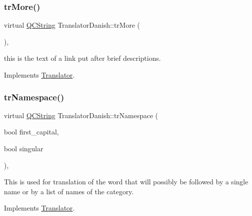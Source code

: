 \mbox{\label{class_translator_danish_a8932b41cc74e969bb4c98dac0f7d1954}} 
\subsubsection{\texorpdfstring{trMore()}{trMore()}}
{\footnotesize\ttfamily virtual \mbox{\hyperlink{class_q_c_string}{Q\+C\+String}} Translator\+Danish\+::tr\+More (\begin{DoxyParamCaption}{ }\end{DoxyParamCaption})\hspace{0.3cm}{\ttfamily [inline]}, {\ttfamily [virtual]}}

this is the text of a link put after brief descriptions. 

Implements \mbox{\hyperlink{class_translator}{Translator}}.

\mbox{\label{class_translator_danish_abab7ef00cc51eb265597124961d8f86b}} 
\subsubsection{\texorpdfstring{trNamespace()}{trNamespace()}}
{\footnotesize\ttfamily virtual \mbox{\hyperlink{class_q_c_string}{Q\+C\+String}} Translator\+Danish\+::tr\+Namespace (\begin{DoxyParamCaption}\item[{bool}]{first\+\_\+capital,  }\item[{bool}]{singular }\end{DoxyParamCaption})\hspace{0.3cm}{\ttfamily [inline]}, {\ttfamily [virtual]}}

This is used for translation of the word that will possibly be followed by a single name or by a list of names of the category. 

Implements \mbox{\hyperlink{class_translator}{Translator}}.

\mbox{\label{class_translator_danish_aff67bbe4ab5cf1a80b4adff71845005a}} 
